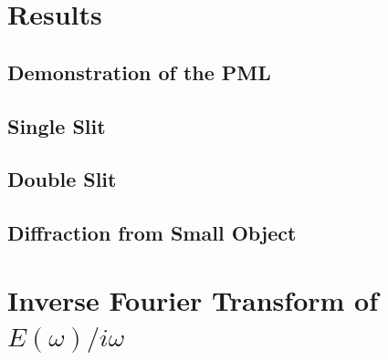 \documentclass[12pt,twocolumn]{article}
\begin{document}
\section{Results}
\subsection{Demonstration of the PML}
\subsection{Single Slit}
\subsection{Double Slit}
\subsection{Diffraction from Small Object}



\newpage
\onecolumn
\appendix
\section{Inverse Fourier Transform of $E(\omega)/i\omega$}
\label{ap:fourier1}
\end{document}
